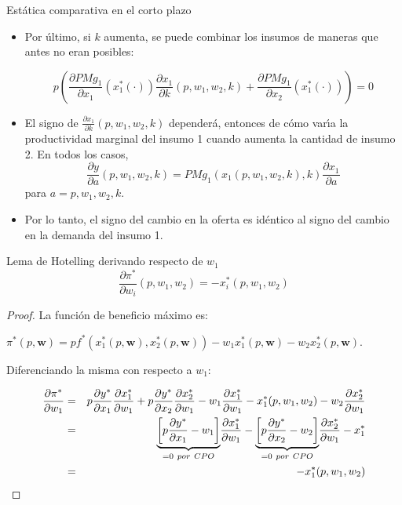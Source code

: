 \documentclass{beamer}
\theoremstyle{definition}
\begin{document}
\begin{frame}[noframenumbering]{Est\'atica comparativa en el corto plazo} \small
	\begin{itemize}
\item Por \'{u}ltimo, si $k$ aumenta, se puede combinar los insumos de maneras que antes no eran posibles:

\[
p\left(\frac{\partial PMg_{1}}{\partial x_{1}}(x_{1}^*(\cdot))\frac{\partial x_{1}}{\partial k}(p,w_{1},w_{2},k)+\frac{\partial PMg_{1}}{\partial x_{2}}(x_{1}^*(\cdot))\right)=0
\]
\item El signo de $\frac{\partial x_{1}}{\partial k}(p,w_{1},w_{2},k)$ depender\'{a}, entonces de c\'{o}mo var\'{\i}a la productividad marginal del insumo 1 cuando aumenta la cantidad de insumo 2. En todos los casos,
\[
\frac{\partial y}{\partial a}(p,w_{1},w_{2},k)=PMg_{1}(x_{1}(p,w_{1},w_{2},k),k)\frac{\partial x_1}{\partial a}
\]
para $a = p, w_{1}, w_{2}, k$.
\item Por lo tanto, el signo del cambio en la oferta es id\'{e}ntico al signo del cambio en la demanda del insumo 1.
	\end{itemize}
	\end{frame}

 \begin{frame}[noframenumbering]{Lema de Hotelling derivando respecto de $w_1$}\small
\[\frac{\partial \pi^*}{\partial w_{i}}(p,w_{1},w_{2})=-x_{i}^*(p,w_{1},w_{2})\]
\begin{proof}
La funci\'{o}n de beneficio m\'{a}ximo es: 
\begin{center}
$\pi ^{\ast
}(p,\textbf{w})=pf^{\ast }\left( x_{1}^{\ast }(p,\textbf{w}),x_{2}^{\ast
}(p,\textbf{w})\right)-w_{1}x_{1}^{\ast }(p,\textbf{w})-w_{2}x_{2}^{\ast
}(p,\textbf{w})$. 
\end{center}
Diferenciando la misma con respecto a $w_{1}$:

\begin{eqnarray*}
\frac{\partial \pi ^{\ast }}{\partial w_{1}} &=&p\frac{\partial y^{\ast }}{%
\partial x_{1}}\frac{\partial x_{1}^{\ast }}{\partial w_{1}}+p\frac{\partial
y^{\ast }}{\partial x_{2}}\frac{\partial x_{2}^{\ast }}{\partial w_{1}}-w_{1}%
\frac{\partial x_{1}^{\ast }}{\partial w_{1}}-x_{1}^{\ast
}(p,w_{1},w_{2})-w_{2}\frac{\partial x_{2}^{\ast }}{\partial w_{1}} \\
&=&\underset{=0 \ por \ CPO}{\underbrace{\left[ p\frac{\partial y^{\ast }}{\partial x_{1}%
}-w_{1}\right] }}\frac{\partial x_{1}^{\ast }}{\partial w_{1}}-\underset{=0 \ por \ CPO}{%
\underbrace{\left[ p\frac{\partial y^{\ast }}{\partial x_{2}}-w_{2}\right] }}\frac{\partial x_{2}^{\ast }}{\partial w_{1}}%
-x_{1}^{\ast } \\
&=&-x_{1}^{\ast }(p,w_{1},w_{2})
\end{eqnarray*}
\end{proof}
\end{frame}
\end{document}
